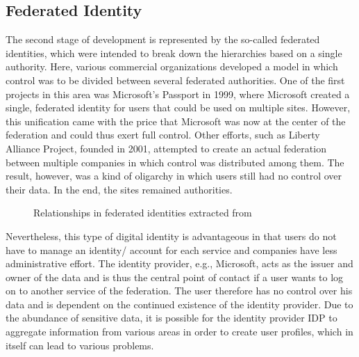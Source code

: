 	    
	    \subsection{Federated Identity}
	    
	    The second stage of development is represented by the so-called federated identities, which were intended to break down the hierarchies based on a single authority. Here, various commercial organizations developed a model in which control was to be divided between several federated authorities. One of the first projects in this area was Microsoft's Passport in 1999, where Microsoft created a single, federated identity for users that could be used on multiple sites. However, this unification came with the price that Microsoft was now at the center of the federation and could thus exert full control. Other efforts, such as Liberty Alliance Project, founded in 2001, attempted to create an actual federation between multiple companies in which control was distributed among them. The result, however, was a kind of oligarchy in which users still had no control over their data. In the end, the sites remained authorities. \cite{allen_path_2016}
	    
	    \begin{figure}[ht]
    	    \centering
    	    \makebox[\textwidth]{}
            \caption{Relationships in federated identities extracted from \cite[p. 8]{preukschat_self-sovereign_2021}}
            \label{figure: federated}
        \end{figure}
	    
	    Nevertheless, this type of digital identity is advantageous in that users do not have to manage an identity/ account for each service and companies have less administrative effort. The identity provider, e.g., Microsoft, acts as the issuer and owner of the data and is thus the central point of contact if a user wants to log on to another service of the federation. The user therefore has no control over his data and is dependent on the continued existence of the identity provider. Due to the abundance of sensitive data, it is possible for the identity provider \ac{IDP} to aggregate information from various areas in order to create user profiles, which in itself can lead to various problems. \cite[pp. 6 - 7]{ehrlich_self-sovereign_2021}
	    
